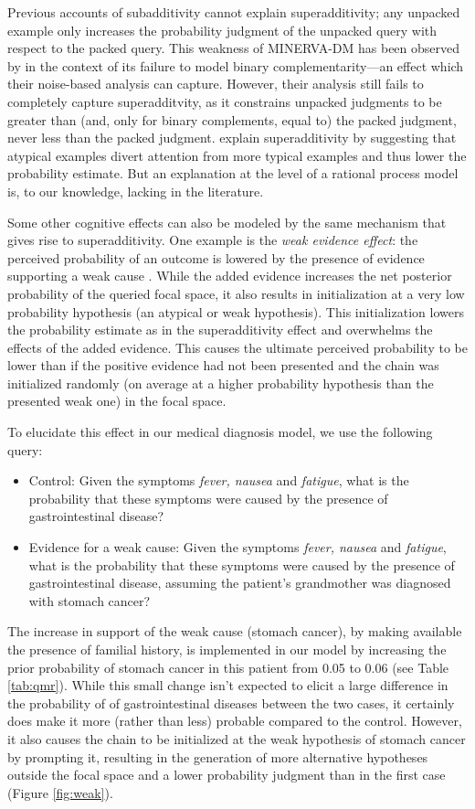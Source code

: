 Previous accounts of subadditivity \citep[e.g.,][]{Thomas2008, MINERVAsub} cannot explain superadditivity; any unpacked example only increases the probability judgment of the unpacked query with respect to the packed query. This weakness of MINERVA-DM has been observed by \cite{Costello2014} in the context of its failure to model binary complementarity---an effect which their noise-based analysis can capture. However, their analysis still fails to completely capture superadditvity, as it constrains unpacked judgments to be greater than (and, only for binary complements, equal to) the packed judgment, never less than the packed judgment. \cite{super} explain superadditivity by suggesting that atypical examples divert attention from more typical examples and thus lower the probability estimate. But an explanation at the level of a rational process model is, to our knowledge, lacking in the literature. 

Some other cognitive effects can also be modeled by the same mechanism that gives rise to superadditivity. One example is the \emph{weak evidence effect}: the perceived probability of an outcome is lowered by the presence of evidence supporting a weak cause \citep{weak}. While the added evidence increases the net posterior probability of the queried focal space, it also results in initialization at a very low probability hypothesis (an atypical or weak hypothesis). This initialization lowers the probability estimate as in the superadditivity effect and overwhelms the effects of the added evidence. This causes the ultimate perceived probability to be lower than if the positive evidence had not been presented and the chain was initialized randomly (on average at a higher probability hypothesis than the presented weak one) in the focal space.

To elucidate this effect in our medical diagnosis model, we use the following query:
\begin{itemize}
\item Control: Given the symptoms \emph{fever, nausea}  and \emph{fatigue}, what is the probability that these symptoms were caused by the presence of gastrointestinal disease?
\item Evidence for a weak cause: Given the symptoms \emph{fever, nausea}  and \emph{fatigue}, what is the probability that these symptoms were caused by the presence of gastrointestinal disease, assuming the patient's grandmother was diagnosed with stomach cancer?
\end{itemize}
The increase in support of the weak cause (stomach cancer), by making available the presence of familial history, is implemented in our model by increasing the prior probability of stomach cancer in this patient from 0.05 to 0.06 (see Table \ref{tab:qmr}). While this small change isn't expected to elicit a large difference in the probability of of gastrointestinal diseases between the two cases, it certainly does make it more (rather than less) probable compared to the control. However, it also causes the chain to be initialized at the weak hypothesis of stomach cancer by prompting it, resulting in the generation of more alternative hypotheses outside the focal space and a lower probability judgment than in the first case (Figure \ref{fig:weak}).

